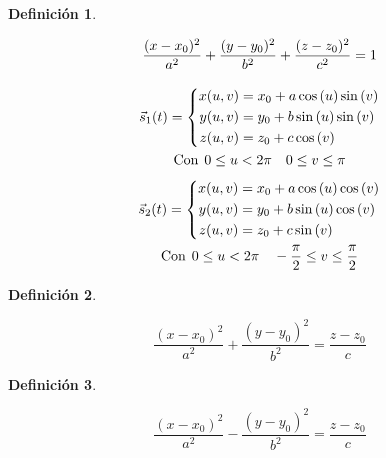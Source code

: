 \documentclass[a5paper,12pt,twoside]{book}
\newtheorem{defn}{{Definición}}[chapter]
\begin{document}
\begin{mdframed}[style=DefinitionFrame]
    \begin{defn}
    \end{defn}
    \begin{gather*}
        \frac{(x-x_0)^2}{a^2} + \frac{(y-y_0)^2}{b^2} + \frac{(z-z_0)^2}{c^2} = 1
        \\[1em]
        \Vec{s}_1(t) = \left\{
        \begin{aligned}
            x(u,v) &= x_0 + a \cos{(u)} \sin{(v)} \\
            y(u,v) &= y_0 + b \sin{(u)} \sin{(v)} \\
            z(u,v) &= z_0 + c \cos{(v)}
        \end{aligned}
        \right.
        \\
        \textrm{Con} \hspace{1ex} 0 \leq u < 2 \pi \quad 0 \leq v \leq \pi
        \\[1ex]
        \Vec{s}_2(t) = \left\{
        \begin{aligned}
            x(u,v) &= x_0 + a \cos{(u)} \cos{(v)} \\
            y(u,v) &= y_0 + b \sin{(u)} \cos{(v)} \\
            z(u,v) &= z_0 + c \sin{(v)}
        \end{aligned}
        \right.
        \\
        \textrm{Con} \hspace{1ex} 0 \leq u < 2 \pi \quad -\dfrac{\pi}{2} \leq v \leq \dfrac{\pi}{2}
    \end{gather*}
\end{mdframed}

\begin{mdframed}[style=DefinitionFrame]
    \begin{defn}
    \end{defn}
    \begin{equation*}
        \dfrac{(x-x_0)^2}{a^2} + \dfrac{(y-y_0)^2}{b^2} = \dfrac{z-z_0}{c}
    \end{equation*}
\end{mdframed}

\begin{mdframed}[style=DefinitionFrame]
    \begin{defn}
    \end{defn}
    \begin{equation*}
        \dfrac{(x-x_0)^2}{a^2} - \dfrac{(y-y_0)^2}{b^2} = \dfrac{z-z_0}{c}
    \end{equation*}
\end{mdframed}
\end{document}
